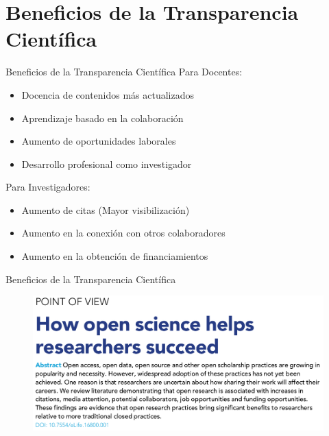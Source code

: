 \documentclass{beamer}
\begin{document}
\section{Beneficios de la Transparencia Científica}
\begin{frame}{Beneficios de la Transparencia Científica}
Para Docentes:
\begin{itemize}
    \item Docencia de contenidos más actualizados
    \item Aprendizaje basado en la colaboración
    \item Aumento de oportunidades laborales
    \item Desarrollo profesional como investigador
\end{itemize}
Para Investigadores:
\begin{itemize}
    \item Aumento de citas (Mayor visibilización)
    \item Aumento en la conexión con otros colaboradores
    \item Aumento en la obtención de financiamientos
\end{itemize}
\end{frame}

\begin{frame}{Beneficios de la Transparencia Científica}
\begin{figure}
\includegraphics[width=1\textwidth]{OSB.png}
\end{figure}
\cite{Mckiernan2016}
\end{frame}
\end{document}
